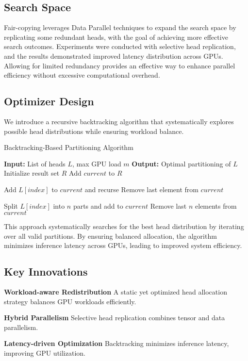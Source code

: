 \subsection{Search Space}
Fair-copying leverages Data Parallel techniques to expand the search space by replicating some redundant heads, with the goal of achieving more effective search outcomes. Experiments were conducted with selective head replication, and the results demonstrated improved latency distribution across GPUs. Allowing for limited redundancy provides an effective way to enhance parallel efficiency without excessive computational overhead.



\subsection{Optimizer Design}

We introduce a recursive backtracking algorithm that systematically explores possible head distributions while ensuring workload balance.

\begin{algorithm}
\caption{Backtracking-Based Partitioning Algorithm}
\begin{algorithmic}
\State \textbf{Input:} List of heads $L$, max GPU load $m$
\State \textbf{Output:} Optimal partitioning of $L$
\State Initialize result set $R$
        \State Add $current$ to $R$
        \Return
    \EndIf
    
    \State Add $L[index]$ to $current$ and recurse
    \State Remove last element from $current$
    
        \State Split $L[index]$ into $n$ parts and add to $current$
        \State Remove last $n$ elements from $current$
    \EndFor
\EndProcedure
\end{algorithmic}
\end{algorithm}
This approach systematically searches for the best head distribution by iterating over all valid partitions. By ensuring balanced allocation, the algorithm minimizes inference latency across GPUs, leading to improved system efficiency.

\subsection{Key Innovations}

\noindent\textbf{Workload-aware Redistribution} A static yet optimized head allocation strategy balances GPU workloads efficiently.

\noindent\textbf{Hybrid Parallelism} Selective head replication combines tensor and data parallelism.

\noindent\textbf{Latency-driven Optimization} Backtracking minimizes inference latency, improving GPU utilization.

